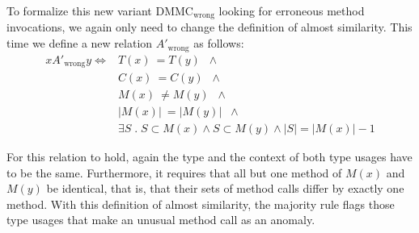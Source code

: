 To formalize this new variant $\text{DMMC}_{\text{wrong}}$ looking for erroneous method invocations, we again only need to change the definition of almost similarity.
This time we define a new relation $A'_{\text{wrong}}$ as follows:
\begin{align*}
xA'_{\text{wrong}}y \iff & T(x) \: = T(y) \;\; \land \\
                                & C(x) \: = C(y) \;\; \land \\
                                & M(x) \: \neq M(y) \;\; \land \\
                                & |M(x)| \:  = |M(y)| \;\; \land \\
                                & \exists S \; . \; S \subset M(x) \land S \subset M(y) \land |S| = |M(x)| - 1
\end{align*}

For this relation to hold, again the type and the context of both type usages have to be the same.
Furthermore, it requires that all but one method of $M(x)$ and $M(y)$ be identical, that is, that their sets of method calls differ by exactly one method.
With this definition of almost similarity, the majority rule flags those type usages that make an unusual method call as an anomaly.


